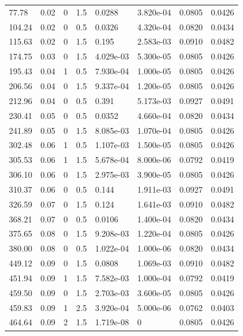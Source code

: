 \documentclass[preview]{standalone}
\begin{document}
{{\begin{tabular}{L{1.2cm}C{1.2cm} C{0.3cm}C{0.5cm} C{1.4cm}C{1.4cm} C{1.4cm}C{1.4cm}}
  77.78  &  0.02  & 0     & 1.5 &  0.0288  & 3.820e-04  & 0.0805 &  0.0426   \\ 
  104.24  &  0.02  & 0     & 0.5 &  0.0326  & 4.320e-04  & 0.0820 &  0.0434   \\ 
  115.63  &  0.02  & 0     & 1.5 &  0.195  & 2.583e-03  & 0.0910 &  0.0482   \\ 
  174.75  &  0.03  & 0     & 1.5 &  4.029e-03  & 5.300e-05  & 0.0805 &  0.0426   \\ 
  195.43  &  0.04  & 1     & 0.5 &  7.930e-04  & 1.000e-05  & 0.0805 &  0.0426   \\ 
  206.56  &  0.04  & 0     & 1.5 &  9.337e-04  & 1.200e-05  & 0.0805 &  0.0426   \\ 
  212.96  &  0.04  & 0     & 0.5 &  0.391  & 5.173e-03  & 0.0927 &  0.0491   \\ 
  230.41  &  0.05  & 0     & 0.5 &  0.0352  & 4.660e-04  & 0.0820 &  0.0434   \\ 
  241.89  &  0.05  & 0     & 1.5 &  8.085e-03  & 1.070e-04  & 0.0805 &  0.0426   \\ 
  302.48  &  0.06  & 1     & 0.5 &  1.107e-03  & 1.500e-05  & 0.0805 &  0.0426   \\ 
  305.53  &  0.06  & 1     & 1.5 &  5.678e-04  & 8.000e-06  & 0.0792 &  0.0419   \\ 
  306.10  &  0.06  & 0     & 1.5 &  2.975e-03  & 3.900e-05  & 0.0805 &  0.0426   \\ 
  310.37  &  0.06  & 0     & 0.5 &  0.144  & 1.911e-03  & 0.0927 &  0.0491   \\ 
  326.59  &  0.07  & 0     & 1.5 &  0.124  & 1.641e-03  & 0.0910 &  0.0482   \\ 
  368.21  &  0.07  & 0     & 0.5 &  0.0106  & 1.400e-04  & 0.0820 &  0.0434   \\ 
  375.65  &  0.08  & 0     & 1.5 &  9.208e-03  & 1.220e-04  & 0.0805 &  0.0426   \\ 
  380.00  &  0.08  & 0     & 0.5 &  1.022e-04  & 1.000e-06  & 0.0820 &  0.0434   \\ 
  449.12  &  0.09  & 0     & 1.5 &  0.0808  & 1.069e-03  & 0.0910 &  0.0482   \\ 
  451.94  &  0.09  & 1     & 1.5 &  7.582e-03  & 1.000e-04  & 0.0792 &  0.0419   \\ 
  459.50  &  0.09  & 0     & 1.5 &  2.703e-03  & 3.600e-05  & 0.0805 &  0.0426   \\ 
  459.83  &  0.09  & 1     & 2.5 &  3.920e-04  & 5.000e-06  & 0.0762 &  0.0403   \\ 
  464.64  &  0.09  & 2     & 1.5 &  1.719e-08  & 0  & 0.0805 &  0.0426   \\ 

\end{tabular}}}
\end{document}
